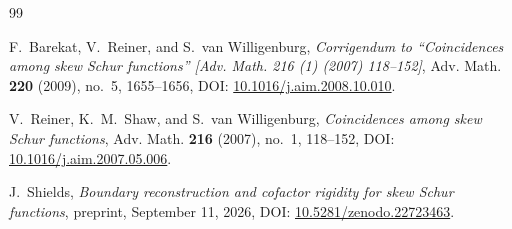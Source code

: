 \documentclass[11pt,a4paper]{amsart}
\numberwithin{equation}{section}
\theoremstyle{plain}
\theoremstyle{definition}
\begin{document}
\begin{thebibliography}{99}

F.~Barekat, V.~Reiner, and S.~van Willigenburg,
\emph{Corrigendum to ``Coincidences among skew Schur functions'' [Adv. Math. 216 (1) (2007) 118--152]},
Adv. Math. \textbf{220} (2009), no.~5, 1655--1656,
DOI: \href{https://doi.org/10.1016/j.aim.2008.10.010}{10.1016/\allowbreak j.aim.2008.10.010}.

V.~Reiner, K.~M.~Shaw, and S.~van Willigenburg,
\emph{Coincidences among skew Schur functions},
Adv. Math. \textbf{216} (2007), no.~1, 118--152,
DOI: \href{https://doi.org/10.1016/j.aim.2007.05.006}{10.1016/\allowbreak j.aim.2007.05.006}.

J.~Shields,
\emph{Boundary reconstruction and cofactor rigidity for skew Schur functions},
preprint, September 11, 2026,
DOI: \href{https://doi.org/10.5281/zenodo.22723463}{10.5281/\allowbreak zenodo.22723463}.

\end{thebibliography}
\end{document}
